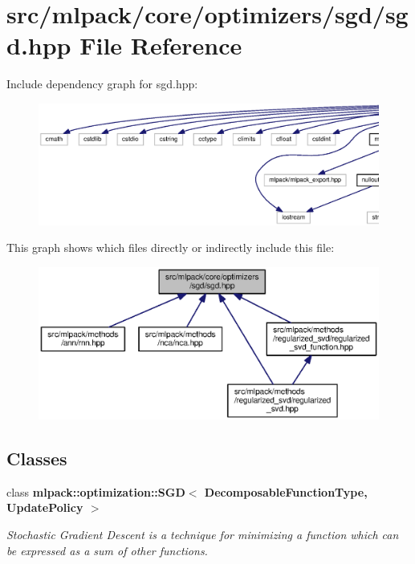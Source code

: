 \section{src/mlpack/core/optimizers/sgd/sgd.hpp File Reference}
\label{sgd_8hpp}
Include dependency graph for sgd.\+hpp\+:
\nopagebreak
\begin{figure}[H]
\begin{center}
\leavevmode
\includegraphics[width=350pt]{sgd_8hpp__incl}
\end{center}
\end{figure}
This graph shows which files directly or indirectly include this file\+:
\nopagebreak
\begin{figure}[H]
\begin{center}
\leavevmode
\includegraphics[width=350pt]{sgd_8hpp__dep__incl}
\end{center}
\end{figure}
\subsection*{Classes}
\begin{DoxyCompactItemize}
\item 
class {\bf mlpack\+::optimization\+::\+S\+G\+D$<$ Decomposable\+Function\+Type, Update\+Policy $>$}
\begin{DoxyCompactList}\small\item\em Stochastic Gradient Descent is a technique for minimizing a function which can be expressed as a sum of other functions. \end{DoxyCompactList}\end{DoxyCompactItemize}
